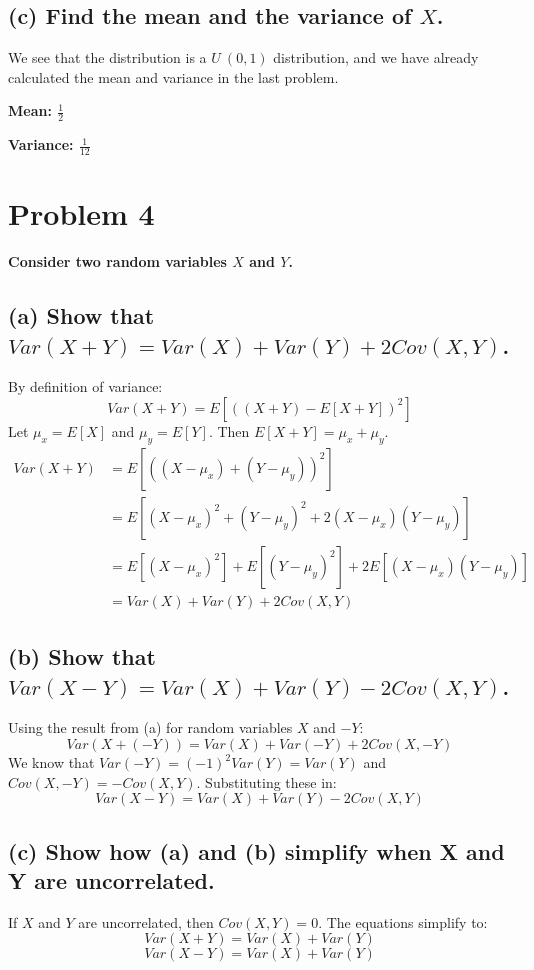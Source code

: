 \documentclass[12pt]{article}
\begin{document}
\subsection*{(c) Find the mean and the variance of $X$.}
We see that the distribution is a $U~(0,1)$ distribution, and we have already calculated the mean and variance in the last problem.

\noindent\textbf{Mean: $\frac{1}{2}$}

\noindent \textbf{Variance: $\frac{1}{12}$}

\newpage

\section*{Problem 4}
\textbf{Consider two random variables $X$ and $Y$.}

\subsection*{(a) Show that $Var(X+Y) = Var(X) + Var(Y) + 2Cov(X,Y)$.}
By definition of variance:
\[ Var(X+Y) = E[((X+Y) - E[X+Y])^2] \]
Let $\mu_x = E[X]$ and $\mu_y = E[Y]$. Then $E[X+Y] = \mu_x + \mu_y$.
\begin{align*}
Var(X+Y) &= E[((X - \mu_x) + (Y - \mu_y))^2] \\
&= E[(X - \mu_x)^2 + (Y - \mu_y)^2 + 2(X-\mu_x)(Y-\mu_y)] \\
&= E[(X - \mu_x)^2] + E[(Y - \mu_y)^2] + 2E[(X-\mu_x)(Y-\mu_y)] \\
&= Var(X) + Var(Y) + 2Cov(X,Y)
\end{align*}

\subsection*{(b) Show that $Var(X-Y) = Var(X) + Var(Y) - 2Cov(X,Y)$.}
Using the result from (a) for random variables $X$ and $-Y$:
\[ Var(X + (-Y)) = Var(X) + Var(-Y) + 2Cov(X, -Y) \]
We know that $Var(-Y) = (-1)^2 Var(Y) = Var(Y)$ and $Cov(X, -Y) = -Cov(X,Y)$.
Substituting these in:
\[ Var(X-Y) = Var(X) + Var(Y) - 2Cov(X,Y) \]

\subsection*{(c) Show how (a) and (b) simplify when X and Y are uncorrelated.}
If $X$ and $Y$ are uncorrelated, then $Cov(X,Y) = 0$.
The equations simplify to:
\[ Var(X+Y) = Var(X) + Var(Y) \]
\[ Var(X-Y) = Var(X) + Var(Y) \]
\end{document}

